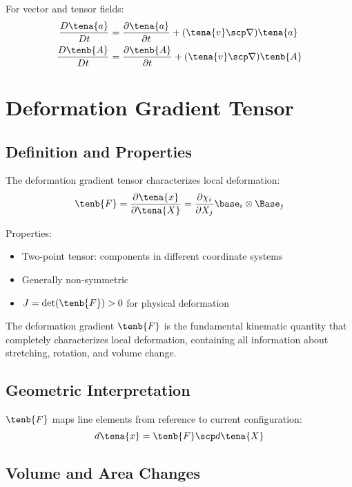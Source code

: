 For vector and tensor fields:
\begin{align}
\frac{D\tena{a}}{Dt} &= \frac{\partial \tena{a}}{\partial t} + (\tena{v} \scp \nabla)\tena{a} \\
\frac{D\tenb{A}}{Dt} &= \frac{\partial \tenb{A}}{\partial t} + (\tena{v} \scp \nabla)\tenb{A}
\end{align}

\section{Deformation Gradient Tensor}

\subsection{Definition and Properties}

The deformation gradient tensor characterizes local deformation:
\begin{equation}
\tenb{F} = \frac{\partial \tena{x}}{\partial \tena{X}} = \frac{\partial \chi_i}{\partial X_j} \base_i \otimes \Base_j
\end{equation}

Properties:
\begin{itemize}
\item Two-point tensor: components in different coordinate systems
\item Generally non-symmetric
\item $J = \det(\tenb{F}) > 0$ for physical deformation
\end{itemize}

\begin{keypoint}
The deformation gradient $\tenb{F}$ is the fundamental kinematic quantity that completely characterizes local deformation, containing all information about stretching, rotation, and volume change.
\end{keypoint}

\subsection{Geometric Interpretation}

$\tenb{F}$ maps line elements from reference to current configuration:
\begin{equation}
d\tena{x} = \tenb{F} \scp d\tena{X}
\end{equation}

\subsection{Volume and Area Changes}

